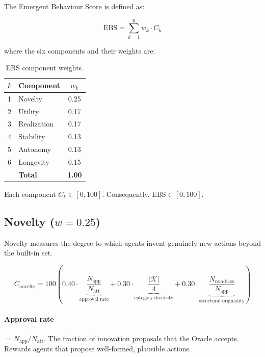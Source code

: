 \documentclass[a4paper, 11pt]{article}
\newcommand{\ebs}{\text{EBS}}
\newcommand{\Natt}{N_{\text{att}}}
\newcommand{\Napp}{N_{\text{app}}}
\begin{document}
The Emergent Behaviour Score is defined as:

\begin{equation}
\boxed{\;
\ebs = \sum_{k=1}^{6} w_k \cdot C_k
\;}
\label{eq:ebs}
\end{equation}

\noindent where the six components and their weights are:

\begin{table}[ht]
\centering
\caption{EBS component weights.}
\label{tab:weights}
\begin{tabular}{@{}llc@{}}
\toprule
$k$ & \textbf{Component} & $w_k$ \\
\midrule
1 & Novelty     & 0.25 \\
2 & Utility     & 0.17 \\
3 & Realization & 0.17 \\
4 & Stability   & 0.13 \\
5 & Autonomy    & 0.13 \\
6 & Longevity   & 0.15 \\
\midrule
  & \textbf{Total} & \textbf{1.00} \\
\bottomrule
\end{tabular}
\end{table}

Each component $C_k \in [0, 100]$. Consequently, $\ebs \in [0, 100]$.

\subsection{Novelty ($w = 0.25$)}

Novelty measures the degree to which agents invent genuinely new actions beyond the built-in set.

\begin{equation}
C_{\text{novelty}} = 100 \left(
    0.40 \cdot \underbrace{\frac{\Napp}{\Natt}}_{\text{approval rate}}
    + 0.30 \cdot \underbrace{\frac{|\mathcal{K}|}{4}}_{\text{category diversity}}
    + 0.30 \cdot \underbrace{\frac{N_{\text{non-base}}}{\Napp}}_{\text{structural originality}}
\right)
\label{eq:novelty}
\end{equation}

\paragraph{Approval rate} $= \Napp / \Natt$. The fraction of innovation proposals that the Oracle accepts. Rewards agents that propose well-formed, plausible actions.
\end{document}
